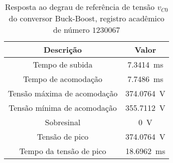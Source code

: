\begin{table}[!ht]
\centering
\caption{Resposta ao degrau de referência de tensão $v_{C0}$ do conversor Buck-Boost, registro acadêmico de número $1230067$}
\label{tab:parametros}
\begin{tabular}{@{}cc@{}}
\toprule
\textbf{Descrição} & \textbf{Valor}\\ \midrule
Tempo de subida & \SI{7.3414}{\milli\s}\\
Tempo de acomodação & \SI{7.7486}{\milli\s}\\
Tensão máxima de acomodação & \SI{374.0764}{\V}\\
Tensão mínima de acomodação & \SI{355.7112}{\V}\\
Sobresinal & \SI{0}{\V}\\
Tensão de pico & \SI{374.0764}{\V}\\
Tempo da tensão de pico & \SI{18.6962}{\milli\s}\\
\bottomrule
\end{tabular}
\end{table}

